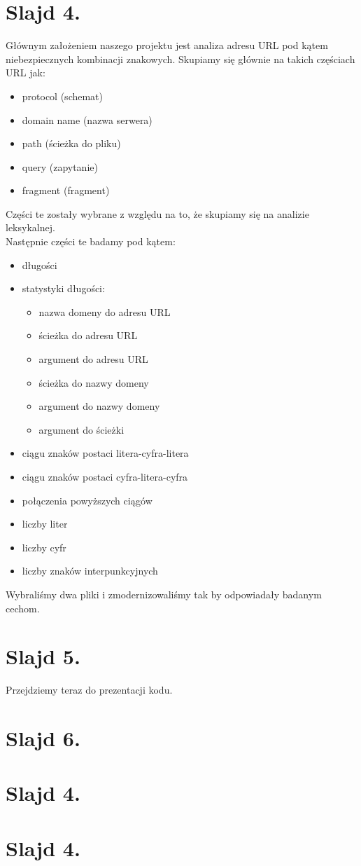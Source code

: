 \documentclass{article}
\begin{document}
\section{Slajd 4.}
{
	Głównym założeniem naszego projektu jest analiza adresu URL pod kątem niebezpiecznych kombinacji znakowych. Skupiamy się głównie na takich częściach URL jak:
	\begin{itemize}
		\item protocol (schemat)
		\item domain name (nazwa serwera)
		\item path (ścieżka do pliku)
		\item query (zapytanie)
		\item fragment (fragment)
	\end{itemize}
	Części te zostały wybrane z względu na to, że skupiamy się na analizie leksykalnej.\\
	Następnie części te badamy pod kątem:
	\begin{itemize}
		\item długości
		\item statystyki długości:
			\begin{itemize}
				\item nazwa domeny do adresu URL
				\item ścieżka do adresu URL
				\item argument do adresu URL
				\item ścieżka do nazwy domeny
				\item argument do nazwy domeny
				\item argument do ścieżki
			\end{itemize}
		\item ciągu znaków postaci litera-cyfra-litera
		\item ciągu znaków postaci cyfra-litera-cyfra
		\item połączenia powyższych ciągów
		\item liczby liter
		\item liczby cyfr
		\item liczby znaków interpunkcyjnych
	\end{itemize}
	Wybraliśmy dwa pliki i zmodernizowaliśmy tak by odpowiadały badanym cechom.
}
\section{Slajd 5.}
{
	Przejdziemy teraz do prezentacji kodu.
}
\section{Slajd 6.}
{
	
}
\section{Slajd 4.}
{
	
}
\section{Slajd 4.}
{
	
}
\end{document}
